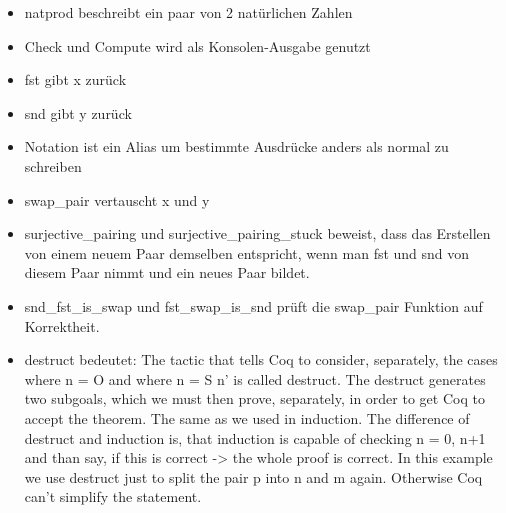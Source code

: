 \begin{itemize}
	\item natprod beschreibt ein paar von 2 natürlichen Zahlen
	\item Check und Compute wird als Konsolen-Ausgabe genutzt
	\item fst gibt x zurück
	\item snd gibt y zurück
	\item Notation ist ein Alias um bestimmte Ausdrücke anders als normal zu schreiben
	\item swap\_pair vertauscht x und y
	\item surjective\_pairing und surjective\_pairing\_stuck beweist, dass das Erstellen von einem neuem Paar demselben entspricht, wenn man fst und snd von diesem Paar nimmt und ein neues Paar bildet.
	\item snd\_fst\_is\_swap und fst\_swap\_is\_snd prüft die swap\_pair Funktion auf Korrektheit.
	\item destruct bedeutet: The tactic that tells Coq to consider, separately, the cases where n = O and where n = S n' is called destruct. The destruct generates two subgoals, which we must then prove, separately, in order to get Coq to accept the theorem. The same as we used in induction. The difference of destruct and induction is, that induction is capable of checking n = 0, n+1 and than say, if this is correct -> the whole proof is correct. In this example we use destruct just to split the pair p into n and m again. Otherwise Coq can't simplify the statement.
\end{itemize}

